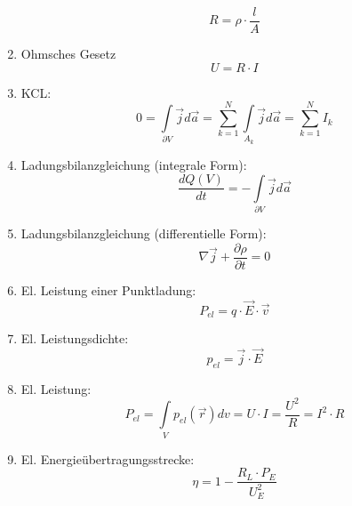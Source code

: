 \documentclass[a4paper,twocolumn,10pt]{article}
\begin{document}
\begin{enumerate}[label=$\bullet$]
\begin{equation*}
R=\rho\cdot\frac{l}{A}
\end{equation*}
\item Ohmsches Gesetz
\begin{equation*}
U=R\cdot I
\end{equation*}
\item KCL:
\begin{equation*}
0=\int\limits_{\partial V}\overrightarrow{j}d\overrightarrow{a}=\sum\limits_{k=1}^{N}\int\limits_{A_k}\overrightarrow{j}d\overrightarrow{a}=\sum\limits_{k=1}^{N}I_k
\end{equation*}
\item Ladungsbilanzgleichung (integrale Form):
\begin{equation*}
\frac{dQ(V)}{dt}=-\int\limits_{\partial V}\overrightarrow{j}d\overrightarrow{a}
\end{equation*}
\item Ladungsbilanzgleichung (differentielle Form):
\begin{equation*}
\nabla\overrightarrow{j}+\frac{\partial \rho}{\partial t}=0
\end{equation*}
\item El. Leistung einer Punktladung:
\begin{equation*}
P_{el}=q\cdot\overrightarrow{E}\cdot\overrightarrow{v}
\end{equation*}
\item El. Leistungsdichte:
\begin{equation*}
p_{el}=\overrightarrow{j}\cdot\overrightarrow{E}
\end{equation*}
\item El. Leistung:
\begin{equation*}
P_{el}=\int\limits_{V}p_{el}(\overrightarrow{r})dv=U\cdot I=\frac{U^2}{R}=I^2\cdot R
\end{equation*}
\item El. Energieübertragungsstrecke:
\begin{equation*}
\eta =1-\frac{R_L\cdot P_E}{U_E^2}
\end{equation*}
\end{enumerate}
\end{document}
